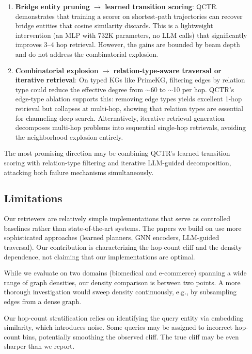 \documentclass[11pt]{article}
\begin{document}
\begin{enumerate}
    \item \textbf{Bridge entity pruning} $\to$ \textbf{learned transition scoring}: QCTR demonstrates that training a scorer on shortest-path trajectories can recover bridge entities that cosine similarity discards. This is a lightweight intervention (an MLP with 732K parameters, no LLM calls) that significantly improves 3--4 hop retrieval. However, the gains are bounded by beam depth and do not address the combinatorial explosion.
    \item \textbf{Combinatorial explosion} $\to$ \textbf{relation-type-aware traversal or iterative retrieval}: On typed KGs like PrimeKG, filtering edges by relation type could reduce the effective degree from $\sim$60 to $\sim$10 per hop. QCTR's edge-type ablation supports this: removing edge types yields excellent 1-hop retrieval but collapses at multi-hop, showing that relation types are essential for channeling deep search. Alternatively, iterative retrieval-generation~\citep{trivedi2023ircot} decomposes multi-hop problems into sequential single-hop retrievals, avoiding the neighborhood explosion entirely.
\end{enumerate}

The most promising direction may be combining QCTR's learned transition scoring with relation-type filtering and iterative LLM-guided decomposition, attacking both failure mechanisms simultaneously.

\subsection{Limitations}

Our retrievers are relatively simple implementations that serve as controlled baselines rather than state-of-the-art systems. The papers we build on use more sophisticated approaches (learned planners, GNN encoders, LLM-guided traversal). Our contribution is characterizing the hop-count cliff and the density dependence, not claiming that our implementations are optimal.

While we evaluate on two domains (biomedical and e-commerce) spanning a wide range of graph densities, our density comparison is between two points. A more thorough investigation would sweep density continuously, e.g., by subsampling edges from a dense graph.

Our hop-count stratification relies on identifying the query entity via embedding similarity, which introduces noise. Some queries may be assigned to incorrect hop-count bins, potentially smoothing the observed cliff. The true cliff may be even sharper than we report.
\end{document}
